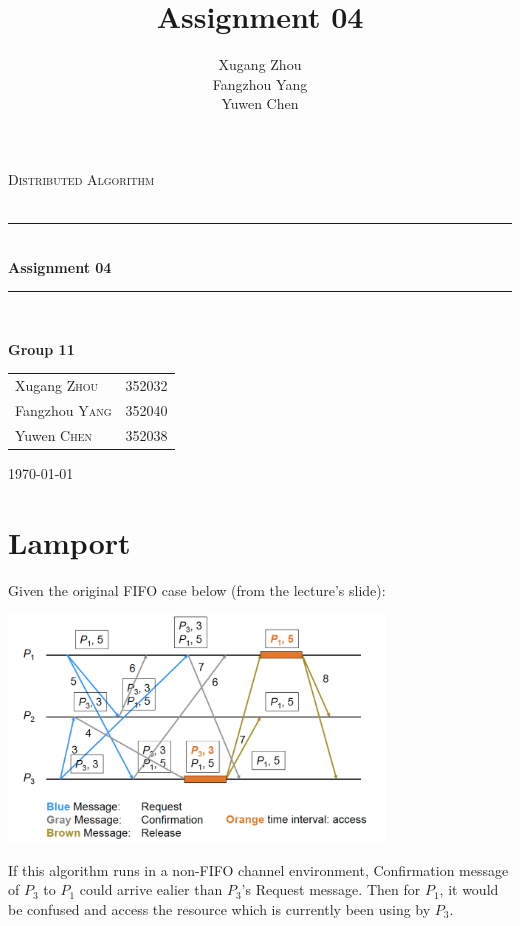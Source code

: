 \documentclass[a4paper, 14pt]{article}
\title{\bf Assignment 04}
\author{Xugang Zhou \\ Fangzhou Yang \\ Yuwen Chen}
\newcommand{\HRule}{\rule{\linewidth}{0.5mm}}
\begin{document}
\begin{titlepage}
\begin{center}
\vfill
\textsc{\LARGE Distributed Algorithm}\\[1.5cm]
\textsc{\Large }\\[0.5cm]

\HRule \\[0.4cm]
{\huge \bfseries Assignment 04}\\[0.4cm]
\HRule \\[1.5cm]
\begin{minipage}{0.4\textwidth}
\begin{flushleft} \large
\large{\textbf{Group 11}}
\end{flushleft}
\end{minipage}
\begin{minipage}{0.4\textwidth}
\begin{flushright} \large
\begin{tabular}{ll}
Xugang \textsc{Zhou} & 352032\\
Fangzhou \textsc{Yang} & 352040\\
Yuwen \textsc{Chen} & 352038
\end{tabular}
\end{flushright}
\end{minipage}
\vfill
{\large \today}\\
\end{center}
\end{titlepage}
\thispagestyle{fancy}

\section{Lamport}

Given the original FIFO case below (from the lecture's slide):\\
\centerline{\includegraphics[width=10cm]{LamportExample.png}}
If this algorithm runs in a non-FIFO channel environment, {\color{light-gray}Confirmation}
message of $P_3$ to $P_1$ could arrive ealier than $P_3$'s
{\color{blue}Request} message. Then for $P_1$, it would be confused
and access the resource which is currently been using by $P_3$. \cite{Lamport1978}
\end{document}
